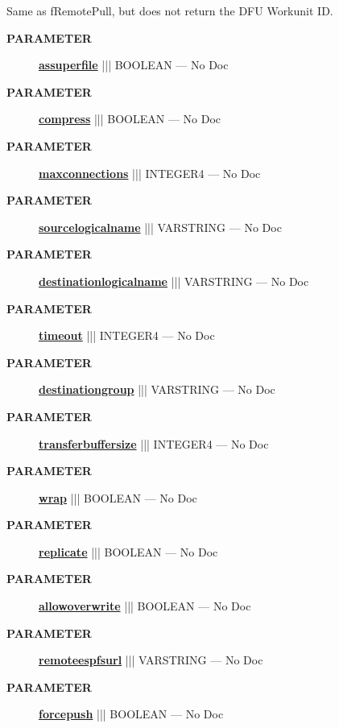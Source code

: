 \par





Same as fRemotePull, but does not return the DFU Workunit ID.






\par
\begin{description}
\item [\colorbox{tagtype}{\color{white} \textbf{\textsf{PARAMETER}}}] \textbf{\underline{assuperfile}} ||| BOOLEAN --- No Doc
\item [\colorbox{tagtype}{\color{white} \textbf{\textsf{PARAMETER}}}] \textbf{\underline{compress}} ||| BOOLEAN --- No Doc
\item [\colorbox{tagtype}{\color{white} \textbf{\textsf{PARAMETER}}}] \textbf{\underline{maxconnections}} ||| INTEGER4 --- No Doc
\item [\colorbox{tagtype}{\color{white} \textbf{\textsf{PARAMETER}}}] \textbf{\underline{sourcelogicalname}} ||| VARSTRING --- No Doc
\item [\colorbox{tagtype}{\color{white} \textbf{\textsf{PARAMETER}}}] \textbf{\underline{destinationlogicalname}} ||| VARSTRING --- No Doc
\item [\colorbox{tagtype}{\color{white} \textbf{\textsf{PARAMETER}}}] \textbf{\underline{timeout}} ||| INTEGER4 --- No Doc
\item [\colorbox{tagtype}{\color{white} \textbf{\textsf{PARAMETER}}}] \textbf{\underline{destinationgroup}} ||| VARSTRING --- No Doc
\item [\colorbox{tagtype}{\color{white} \textbf{\textsf{PARAMETER}}}] \textbf{\underline{transferbuffersize}} ||| INTEGER4 --- No Doc
\item [\colorbox{tagtype}{\color{white} \textbf{\textsf{PARAMETER}}}] \textbf{\underline{wrap}} ||| BOOLEAN --- No Doc
\item [\colorbox{tagtype}{\color{white} \textbf{\textsf{PARAMETER}}}] \textbf{\underline{replicate}} ||| BOOLEAN --- No Doc
\item [\colorbox{tagtype}{\color{white} \textbf{\textsf{PARAMETER}}}] \textbf{\underline{allowoverwrite}} ||| BOOLEAN --- No Doc
\item [\colorbox{tagtype}{\color{white} \textbf{\textsf{PARAMETER}}}] \textbf{\underline{remoteespfsurl}} ||| VARSTRING --- No Doc
\item [\colorbox{tagtype}{\color{white} \textbf{\textsf{PARAMETER}}}] \textbf{\underline{forcepush}} ||| BOOLEAN --- No Doc
\end{description}







